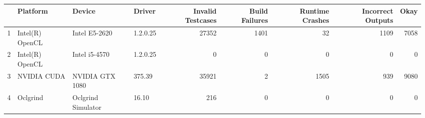 \begin{tabular}{llllrrrrr}
\toprule
{} &         Platform &              Device &    Driver &  Invalid Testcases &  Build Failures &  Runtime Crashes &  Incorrect Outputs &  Okay \\
\midrule
1 &  Intel(R) OpenCL &       Intel E5-2620 &  1.2.0.25 &              27352 &            1401 &               32 &               1109 &  7058 \\
2 &  Intel(R) OpenCL &       Intel i5-4570 &  1.2.0.25 &                  0 &               0 &                0 &                  0 &     0 \\
3 &      NVIDIA CUDA &     NVIDIA GTX 1080 &    375.39 &              35921 &               2 &             1505 &                939 &  9080 \\
4 &         Oclgrind &  Oclgrind Simulator &     16.10 &                216 &               0 &                0 &                  0 &     0 \\
\bottomrule
\end{tabular}

